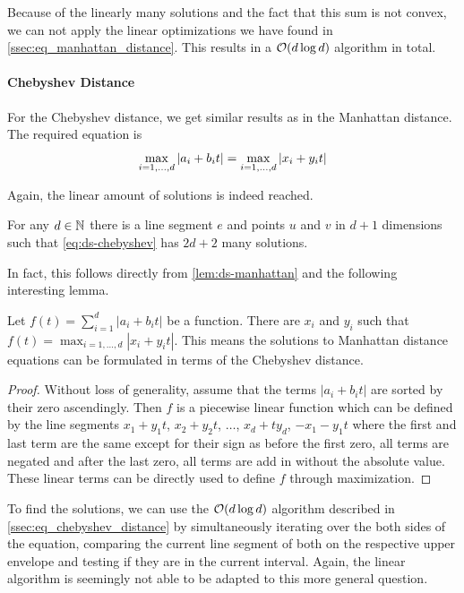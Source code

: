 Because of the linearly many solutions and the fact that this sum is not convex, we can not apply the linear optimizations we have found in \cref{ssec:eq_manhattan_distance}. This results in a \(\mathcal{O}(d\log d)\) algorithm in total.

\paragraph{Chebyshev Distance}
For the Chebyshev distance, we get similar results as in the Manhattan distance. The required equation is 
\begin{equation}\label{eq:ds-chebyshev}
	\max_{i=1, \dots, d} \left|a_i + b_i t\right| = \max_{i=1, \dots, d} \left|x_i + y_i t\right|
\end{equation}

Again, the linear amount of solutions is indeed reached.

\begin{lemma}
	For any \(d \in \mathbb{N}\) there is a line segment \(e\) and points \(u\) and \(v\) in \(d+1\) dimensions such that \cref{eq:ds-chebyshev} has \(2d + 2\) many solutions. 
\end{lemma}

In fact, this follows directly from \cref{lem:ds-manhattan} and the following interesting lemma.

\begin{lemma}\label{lem:manhattan-is-chebyshev}
	Let \(f(t) = \sum_{i=1}^d |a_i + b_i t|\) be a function. There are \(x_i\) and \(y_i\) such that \(f(t) = \max_{i=1, \dots, d} |x_i + y_i t|\). This means the solutions to Manhattan distance equations can be formulated in terms of the Chebyshev distance.
\end{lemma}

\begin{proof}
	Without loss of generality, assume that the terms \(|a_i + b_i t|\) are sorted by their zero ascendingly. Then \(f\) is a piecewise linear function which can be defined by the line segments \(x_1 + y_1 t\), \(x_2 + y_2 t\), \(\dots\), \(x_d + t y_d\), \(-x_1 - y_1 t\) where the first and last term are the same except for their sign as before the first zero, all terms are negated and after the last zero, all terms are add in without the absolute value. These linear terms can be directly used to define \(f\) through maximization. 
\end{proof}

To find the solutions, we can use the \(\mathcal{O}(d \log d)\) algorithm described in \cref{ssec:eq_chebyshev_distance} by simultaneously iterating over the both sides of the equation, comparing the current line segment of both on the respective upper envelope and testing if they are in the current interval. Again, the linear algorithm is seemingly not able to be adapted to this more general question.



